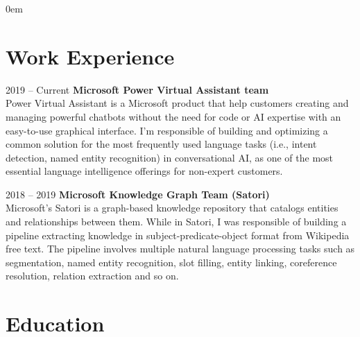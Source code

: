 \documentclass[a4paper, 11pt]{article}
\begin{document}
\large
\parindent 0em
\thispagestyle{myheadings}

   \makecvtitle




\section{Work Experience}
\begin{CV}
\item[2019 -- Current] \textbf{Microsoft Power Virtual Assistant team} \\
Power Virtual Assistant is a Microsoft product that help customers creating and managing powerful chatbots without the need for code or AI expertise with an easy-to-use graphical interface. I'm responsible of building and optimizing a common solution for the most frequently used language tasks (i.e., intent detection, named entity recognition) in conversational AI, as one of the most essential language intelligence offerings for non-expert customers.\\ 

\item[2018 -- 2019] \textbf{Microsoft Knowledge Graph Team (Satori)}\\
Microsoft's Satori is a graph-based knowledge repository that catalogs entities and relationships between them. While in Satori, I was responsible of building a pipeline extracting knowledge in subject-predicate-object format from Wikipedia free text. The pipeline involves multiple natural language processing tasks such as segmentation, named entity recognition, slot filling, entity linking, coreference resolution, relation extraction and so on.  
  
\vspace{2mm}
\end{CV}

\section{Education}
\end{document}
